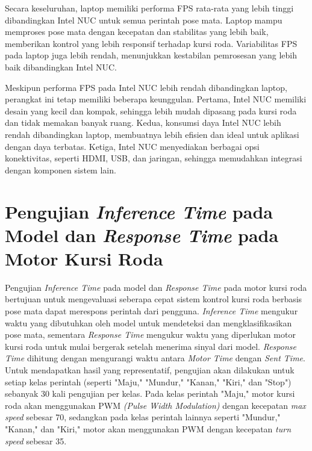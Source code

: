 Secara keseluruhan, laptop memiliki performa FPS rata-rata yang lebih tinggi dibandingkan Intel NUC untuk semua perintah pose mata. Laptop mampu memproses pose mata dengan kecepatan dan stabilitas yang lebih baik, memberikan kontrol yang lebih responsif terhadap kursi roda. Variabilitas FPS pada laptop juga lebih rendah, menunjukkan kestabilan pemrosesan yang lebih baik dibandingkan Intel NUC.

Meskipun performa FPS pada Intel NUC lebih rendah dibandingkan laptop, perangkat ini tetap memiliki beberapa keunggulan. Pertama, Intel NUC memiliki desain yang kecil dan kompak, sehingga lebih mudah dipasang pada kursi roda dan tidak memakan banyak ruang. Kedua, konsumsi daya Intel NUC lebih rendah dibandingkan laptop, membuatnya lebih efisien dan ideal untuk aplikasi dengan daya terbatas. Ketiga, Intel NUC menyediakan berbagai opsi konektivitas, seperti HDMI, USB, dan jaringan, sehingga memudahkan integrasi dengan komponen sistem lain. 

\section{Pengujian \emph{Inference Time} pada Model dan \emph{Response Time} pada Motor Kursi Roda}

Pengujian \emph{Inference Time} pada model dan \emph{Response Time} pada motor kursi roda bertujuan untuk mengevaluasi seberapa cepat sistem kontrol kursi roda berbasis pose mata dapat merespons perintah dari pengguna. \emph{Inference Time} mengukur waktu yang dibutuhkan oleh model untuk mendeteksi dan mengklasifikasikan pose mata, sementara \emph{Response Time} mengukur waktu yang diperlukan motor kursi roda untuk mulai bergerak setelah menerima sinyal dari model. \emph{Response Time} dihitung dengan mengurangi waktu antara \emph{Motor Time} dengan \emph{Sent Time}. Untuk mendapatkan hasil yang representatif, pengujian akan dilakukan untuk setiap kelas perintah (seperti "Maju," "Mundur," "Kanan," "Kiri," dan "Stop") sebanyak 30 kali pengujian per kelas. Pada kelas perintah "Maju," motor kursi roda akan menggunakan PWM \emph{(Pulse Width Modulation)} dengan kecepatan \emph{max speed} sebesar 70, sedangkan pada kelas perintah lainnya seperti "Mundur," "Kanan," dan "Kiri," motor akan menggunakan PWM dengan kecepatan \emph{turn speed} sebesar 35.

